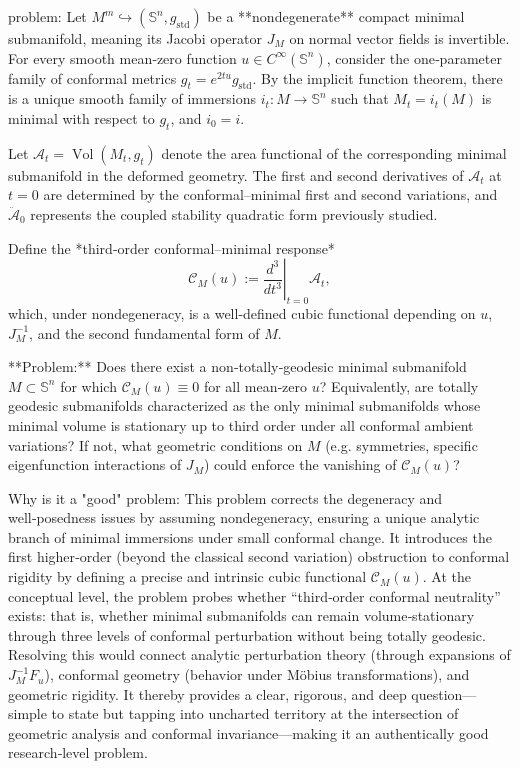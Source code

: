 problem:  
Let \( M^m \hookrightarrow (\mathbb{S}^n, g_{\mathrm{std}}) \) be a **nondegenerate** compact minimal submanifold, meaning its Jacobi operator \(J_M\) on normal vector fields is invertible.  
For every smooth mean‑zero function \(u \in C^\infty(\mathbb{S}^n)\), consider the one‑parameter family of conformal metrics \( g_t = e^{2tu} g_{\mathrm{std}} \).  
By the implicit function theorem, there is a unique smooth family of immersions \( i_t: M \to \mathbb{S}^n \) such that \(M_t = i_t(M)\) is minimal with respect to \(g_t\), and \(i_0 = i\).  

Let \( \mathcal{A}_t = \operatorname{Vol}(M_t, g_t)\) denote the area functional of the corresponding minimal submanifold in the deformed geometry. The first and second derivatives of \(\mathcal{A}_t\) at \(t=0\) are determined by the conformal–minimal first and second variations, and \( \ddot{\mathcal{A}}_0 \) represents the coupled stability quadratic form previously studied.  

Define the *third‑order conformal–minimal response*  
\[
\mathcal{C}_M(u) := \left.\frac{d^3}{dt^3}\right|_{t=0} \mathcal{A}_t ,
\]
which, under nondegeneracy, is a well-defined cubic functional depending on \(u\), \(J_M^{-1}\), and the second fundamental form of \(M\).  

**Problem:**  
Does there exist a non‑totally‑geodesic minimal submanifold \( M \subset \mathbb{S}^n \) for which \( \mathcal{C}_M(u) \equiv 0 \) for all mean‑zero \( u \)?  
Equivalently, are totally geodesic submanifolds characterized as the only minimal submanifolds whose minimal volume is stationary up to third order under all conformal ambient variations?  
If not, what geometric conditions on \(M\) (e.g. symmetries, specific eigenfunction interactions of \(J_M\)) could enforce the vanishing of \(\mathcal{C}_M(u)\)?  

Why is it a "good" problem:  
This problem corrects the degeneracy and well‑posedness issues by assuming nondegeneracy, ensuring a unique analytic branch of minimal immersions under small conformal change. It introduces the first higher‑order (beyond the classical second variation) obstruction to conformal rigidity by defining a precise and intrinsic cubic functional \(\mathcal{C}_M(u)\).  
At the conceptual level, the problem probes whether “third‑order conformal neutrality” exists: that is, whether minimal submanifolds can remain volume‑stationary through three levels of conformal perturbation without being totally geodesic. Resolving this would connect analytic perturbation theory (through expansions of \(J_M^{-1} F_u\)), conformal geometry (behavior under Möbius transformations), and geometric rigidity.  
It thereby provides a clear, rigorous, and deep question—simple to state but tapping into uncharted territory at the intersection of geometric analysis and conformal invariance—making it an authentically good research‑level problem.